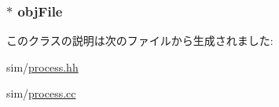 \label{classLiveProcess_a21b2e69f52b03f0645a9203b9b1bb6d7}
\hypertarget{classLiveProcess_ab6cfcfa7903c66267b3e0351c3caa809}{
\subsubsection[{objFile}]{$\ast$ {\bf objFile}}}
\label{classLiveProcess_ab6cfcfa7903c66267b3e0351c3caa809}


このクラスの説明は次のファイルから生成されました:\begin{DoxyCompactItemize}
\item 
sim/\hyperlink{sim_2process_8hh}{process.hh}\item 
sim/\hyperlink{sim_2process_8cc}{process.cc}\end{DoxyCompactItemize}
